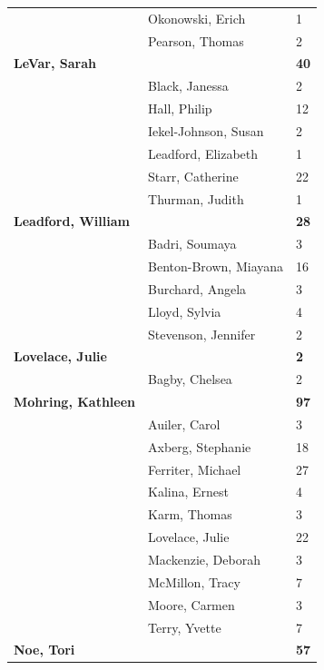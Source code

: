 \documentclass{article}\usepackage[]{graphicx}\usepackage[]{color}
\begin{document}
{\begin{longtable} { >{\raggedright}p{}|p{}p{}}
   \rowcolor[gray]{0.90} & Okonowski, Erich & 1 \\ 
   \rowcolor[gray]{0.90} & Pearson, Thomas & 2 \\ 
  \textbf{LeVar, Sarah} &  & \hspace{2cm}\textbf{40} \\ 
   & Black, Janessa & 2 \\ 
   & Hall, Philip & 12 \\ 
   \rowcolor[gray]{0.90} & Iekel-Johnson, Susan & 2 \\ 
   \rowcolor[gray]{0.90} & Leadford, Elizabeth & 1 \\ 
   \rowcolor[gray]{0.90} & Starr, Catherine & 22 \\ 
   & Thurman, Judith & 1 \\ 
  \textbf{Leadford, William} &  & \hspace{2cm}\textbf{28} \\ 
   & Badri, Soumaya & 3 \\ 
   \rowcolor[gray]{0.90} & Benton-Brown, Miayana & 16 \\ 
   \rowcolor[gray]{0.90} & Burchard, Angela & 3 \\ 
   \rowcolor[gray]{0.90} & Lloyd, Sylvia & 4 \\ 
   & Stevenson, Jennifer & 2 \\ 
  \textbf{Lovelace, Julie} &  & \hspace{2cm}\textbf{2} \\ 
   & Bagby, Chelsea & 2 \\ 
   \rowcolor[gray]{0.90}\textbf{Mohring, Kathleen} &  & \hspace{2cm}\textbf{97} \\ 
   \rowcolor[gray]{0.90} & Auiler, Carol & 3 \\ 
   \rowcolor[gray]{0.90} & Axberg, Stephanie & 18 \\ 
   & Ferriter, Michael & 27 \\ 
   & Kalina, Ernest & 4 \\ 
   & Karm, Thomas & 3 \\ 
   \rowcolor[gray]{0.90} & Lovelace, Julie & 22 \\ 
   \rowcolor[gray]{0.90} & Mackenzie, Deborah & 3 \\ 
   \rowcolor[gray]{0.90} & McMillon, Tracy & 7 \\ 
   & Moore, Carmen & 3 \\ 
   & Terry, Yvette & 7 \\ 
  \textbf{Noe, Tori} &  & \hspace{2cm}\textbf{57} \\ 

\end{longtable}}
\end{document}
